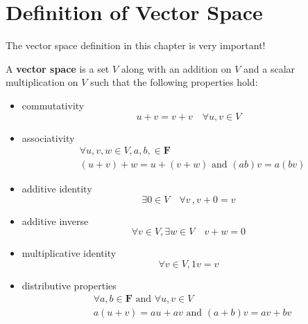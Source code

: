\section{Definition of Vector Space}
\setcounter{exercise}{0}

The vector space definition in this chapter is very important!

\begin{definition}
  A \textbf{vector space} is a set $V$ along with an addition on $V$ and a scalar multiplication on $V$ such that the following properties hold:

  \begin{itemize}
    \item commutativity
          \begin{equation*}
            u + v = v+ v \quad\forall u, v \in V
          \end{equation*}
    \item associativity
          \begin{align*}
             & \forall u, v, w \in V, a, b, \in \mathbf{F}          \\
             & (u + v) + w = u + (v + w) \text{ and } (ab)v = a(bv)
          \end{align*}
    \item additive identity
          \begin{equation*}
            \exists 0 \in V \quad \forall v\,, v + 0 = v
          \end{equation*}
    \item additive inverse
          \begin{equation*}
            \forall v \in V, \exists w \in V \quad v + w = 0
          \end{equation*}
    \item multiplicative identity
          \begin{equation*}
            \forall v \in V, 1v =v
          \end{equation*}
    \item distributive properties
          \begin{align*}
             & \forall a, b \in \mathbf{F} \text{ and } \forall u, v \in V \\
             & a(u + v) = au + av \text{ and } (a+b)v = av + bv
          \end{align*}
  \end{itemize}
\end{definition}



